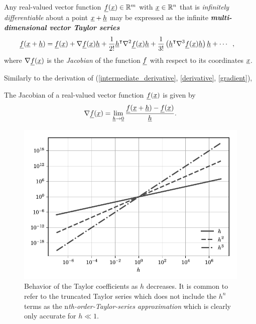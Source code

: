 \begin{theorem}
\label{vector_dimensional_taylors_theorem}
Any real-valued vector function $\underline{f}(\underline{x}) \in \mathbb{R}^m$ with $\underline{x} \in \mathbb{R}^n$ that is \emph{infinitely differentiable} about a point $\underline{x}+\underline{h}$ may be expressed as the infinite \textbf{\emph{multi-dimensional vector Taylor series}}
{\footnotesize
\begin{align}
  \label{vector_taylor_series}
  \underline{f}(\underline{x}+\underline{h}) &= \underline{f}(\underline{x}) + \nabla \underline{f}(\underline{x}) \underline{h} + \frac{1}{2!} \underline{h}^\intercal \nabla^2 \underline{f}(\underline{x}) \underline{h} + \frac{1}{3!} \left( \underline{h}^\intercal \nabla^3 \underline{f}(\underline{x}) \underline{h} \right) \underline{h} + \cdots \hspace{2mm},
\end{align}}
where $\nabla \underline{f}(\underline{x})$ is the \emph{Jacobian} of the function $\underline{f}$ with respect to its coordinates $\underline{x}$.
\end{theorem}

Similarly to the derivation of (\ref{intermediate_derivative}, \ref{derivative}, \ref{gradient}),
\begin{definition}
The Jacobian of a real-valued vector function $\underline{f}(\underline{x})$ is given by 
\begin{align}
  \label{jacobian}
  \nabla \underline{f}(\underline{x}) = \lim_{\underline{h} \rightarrow \underline{0}} \frac{ \underline{f}(\underline{x}+\underline{h}) - \underline{f}(\underline{x}) }{\underline{h}}.
\end{align}
\end{definition}

\begin{figure}[t]
  \centering
    \includegraphics[width=1.0\linewidth]{images/appendix/taylor_example.pdf}
  \caption[Taylor series perturbation]{Behavior of the Taylor coefficients as $h$ decreases.  It is common to refer to the truncated Taylor series which does not include the $h^n$ terms as the \emph{$\mathrm{n}$th-order-Taylor-series approximation} which is clearly only accurate for $h \ll 1$.}
  \label{taylor_perturbations}
\end{figure}

